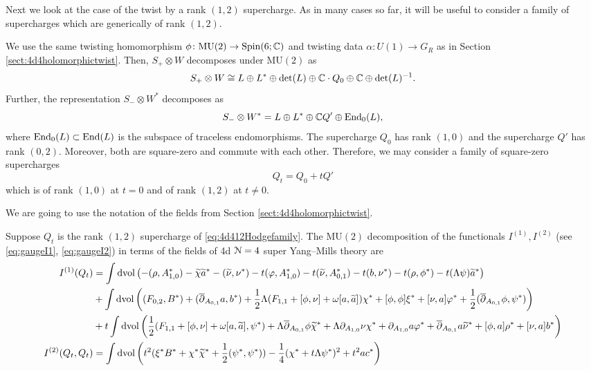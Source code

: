 \documentclass[10pt, oneside]{article}
\newcommand{\MU}{\mathrm{MU}}
\begin{document}
Next we look at the case of the twist by a rank $(1,2)$ supercharge. 
As in many cases so far, it will be useful to consider a family of supercharges which are generically of rank $(1,2)$. 

We use the same twisting homomorphism $\phi\colon \MU(2) \to \Spin(6;\CC)$ and twisting data $\alpha\colon U(1) \to G_R$ as in Section \ref{sect:4d4holomorphictwist}.
Then, $S_+ \otimes W$ decomposes under $\MU(2)$ as
\[
S_+\otimes W\cong L\oplus L^*\oplus \det(L)\oplus \mathbb C \cdot Q_0 \oplus \mathbb C \oplus \det(L)^{-1}.
\]
Further, the representation $S_- \otimes W^*$ decomposes as
\[
S_- \otimes W^* = L \oplus L^* \oplus \mathbb C Q'\oplus\operatorname{End}_0(L),
\]
where $\operatorname{End}_0(L)\subset \operatorname{End}(L)$ is the subspace of traceless endomorphisms. The supercharge $Q_0$ has rank $(1, 0)$ and the supercharge $Q'$ has rank $(0, 2)$. Moreover, both are square-zero and commute with each other. Therefore, we may consider a family of square-zero supercharges
\begin{equation}
Q_t = Q_0 + tQ'
\label{eq:4d412Hodgefamily}
\end{equation}
which is of rank $(1, 0)$ at $t=0$ and of rank $(1, 2)$ at $t\neq 0$.

We are going to use the notation of the fields from Section \ref{sect:4d4holomorphictwist}.

\begin{prop}
Suppose $Q_t$ is the rank $(1,2)$ supercharge of \eqref{eq:4d412Hodgefamily}. The $\MU(2)$ decomposition of the functionals $I^{(1)}, I^{(2)}$ (see \eqref{eq:gaugeI1}, \eqref{eq:gaugeI2}) in terms of the fields of 4d $\mathcal N=4$ super Yang--Mills theory are
\begin{align*}
I^{(1)}(Q_t) &= \int \operatorname{dvol}\left(-(\rho, A_{1, 0}^*) - \widetilde{\chi}\widetilde{a}^* - (\widetilde{\nu}, \nu^*) - t(\varphi, A_{1, 0}^*) - t(\widetilde{\nu}, A_{0, 1}^*) - t(b, \nu^*) - t(\rho, \phi^*) - t(\Lambda\psi)\widetilde{a}^*\right) \\
&+ \int\operatorname{dvol}\left((F_{0, 2}, B^*) + (\overline{\partial}_{A_{0, 1}}a, b^*) + \frac{1}{2}\Lambda(F_{1, 1} + [\phi, \nu] + \omega [a, \widetilde{a}])\chi^* + [\phi, \phi]\xi^* + [\nu, a]\varphi^* + \frac{1}{2} (\overline{\partial}_{A_{0,1}} \phi, \psi^*)\right) \\
&+t\int\operatorname{dvol}\left(\frac{1}{2} (F_{1, 1} + [\phi, \nu] + \omega [a, \widetilde{a}], \psi^*) + \Lambda \overline{\partial}_{A_{0, 1}} \phi \widetilde{\chi}^* + \Lambda \partial_{A_{1, 0}}\nu \chi^* + \partial_{A_{1, 0}} a \varphi^* + \overline{\partial}_{A_{0, 1}} a \widetilde{\nu}^* + [\phi, a]\rho^* + [\nu, a]b^*\right) \\
I^{(2)} (Q_t, Q_t) &= \int \operatorname{dvol} \left(t^2(\xi^*B^* + \chi^*\widetilde{\chi}^* + \frac{1}{2}(\psi^*, \psi^*)) -\frac{1}{4}(\chi^* + t \Lambda\psi^*)^2 + t^2 ac^*\right) \\
\end{align*}
\end{prop}
\end{document}
